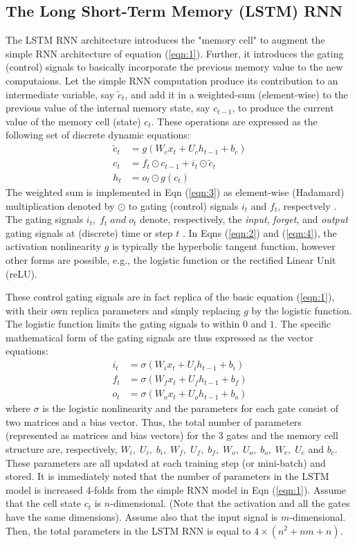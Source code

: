 \documentclass{article}
\begin{document}
\subsection{The Long Short-Term Memory (LSTM) RNN}
The LSTM RNN architecture introduces the "memory cell" to augment the simple RNN architecture of equation (\ref{eqn:1}). Further, it introduces the gating (control)  signals to basically incorporate the previous memory value to the new computaions. Let the simple RNN computation produce its contribution to an intermediate variable, say $\tilde{c}_t$,  and add it in a  weighted-sum (element-wise) to the previous value of the internal memory state, say $c_{t-1}$, to produce the current value of the memory cell (state) $c_t$.  These operations are expressed as the following set of discrete dynamic equations:
\begin{align}
	\label{eqn:2}	\tilde{c}_t &= g(W_c x_t + U_c h_{t-1} + b_c)\\
	\label{eqn:3}	 c_t &= f_t \odot c_{t-1} + i_t \odot \tilde{c}_t\\
	\label{eqn:4}	h_t &= o_t \odot g(c_t)
\end{align}
The weighted sum is implemented in Eqn (\ref{eqn:3}) as element-wise (Hadamard) multiplication denoted by $\odot$ to gating (control) signals $ i_t$ and $ f_t$, respectvely . The gating signals $i_t,\; f_t \; and\; o_t$ denote, respectively, the \textit{input}, \textit{forget}, and \textit{output} gating signals at (discrete) time or step $t$ \cite{hochreiter1997long, Odyssey2016}.  In Eqns (\ref{eqn:2}) and (\ref{eqn:4}), the activation nonlinearity $g$ is typically the hyperbolic tangent function, however other forms are possible, e.g., the logistic function or the rectified Linear Unit (reLU).


These control gating signals are in fact replica of the basic equation (\ref{eqn:1}), with their own replica parameters and simply replacing $g$  by the logistic function. The logistic function limits the gating signals to within $0$ and $1$. The specific mathematical form of the gating signals are thus expressed as the vector equations:
\begin{align}
	i_t &= \sigma(W_i x_t + U_i h_{t-1} + b_i)\\
	f_t &= \sigma(W_f x_t + U_f h_{t-1} + b_f)\\
	o_t &= \sigma(W_o x_t + U_o h_{t-1} + b_o)
\end{align}
where $\sigma$ is the logistic nonlinearity and the parameters for each gate consist of two matrices and a bias vector. Thus, the total number of parameters (represented as matrices and bias vectors) for the 3 gates and the memory cell structure are, respectively, $W_i,\; U_i,\; b_i,\; W_f,\; U_f,\; b_f,\; W_o,\; U_o,\; b_o,\; W_c,\; U_c$ and $b_c$. These parameters are all updated at each training step (or mini-batch) and stored. It is immediately noted that the number of parameters in the LSTM model is increased 4-folds from the simple RNN model in Eqn (\ref{eqn:1}). Assume that the cell state $c_t$ is $n$-dimensional. (Note that the activation and all the gates have the same dimensions). Assume also that the input signal is $m$-dimensional. Then, the total parameters in the LSTM RNN is equal to $4 \times (n^2 + nm +n)$.
\end{document}

